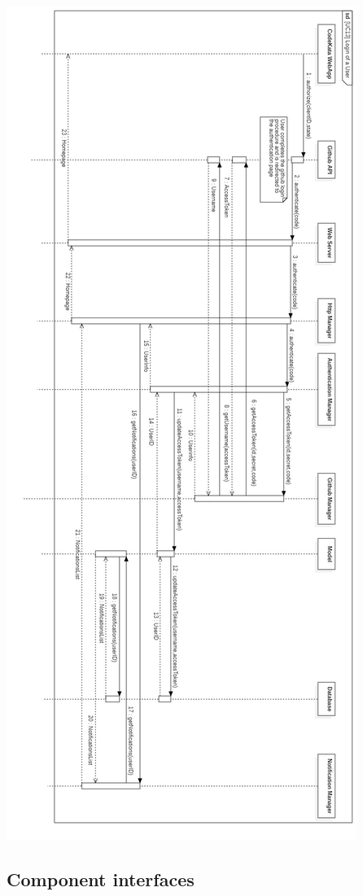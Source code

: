\documentclass{article}
\begin{document}
\newpage
\begin{center}
    \includegraphics[angle=90,width=0.5\linewidth]{uc13.jpg}
  \label{fig:uc13}
\end{center}

\newpage
\subsection{Component interfaces}
\end{document}
